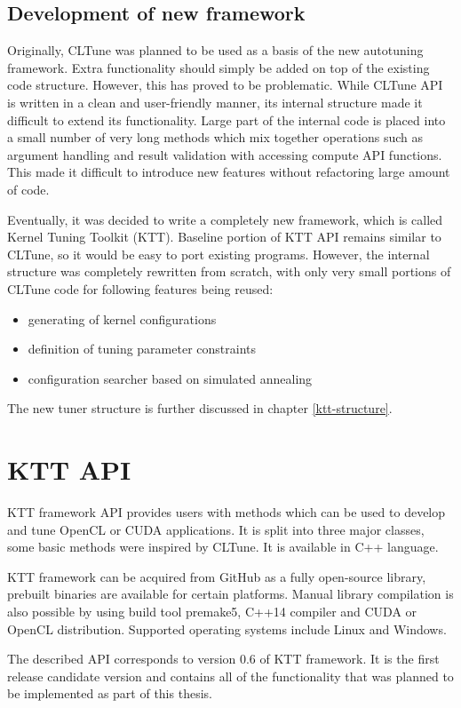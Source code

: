 \documentclass
[
    digital, %
    oneside, %
    table, %
    nolof, %
    nolot, %
    nocover %
]{fithesis3}
\begin{document}
\section{Development of new framework}
Originally, CLTune was planned to be used as a basis of the new autotuning framework. Extra functionality should simply be added on top of the
existing code structure. However, this has proved to be problematic. While CLTune API is written in a clean and user-friendly manner, its
internal structure made it difficult to extend its functionality. Large part of the internal code is placed into a small number of very long methods
which mix together operations such as argument handling and result validation with accessing compute API functions. This made it difficult to
introduce new features without refactoring large amount of code.

Eventually, it was decided to write a completely new framework, which is called Kernel Tuning Toolkit (KTT). Baseline portion of KTT API remains
similar to CLTune, so it would be easy to port existing programs. However, the internal structure was completely rewritten from scratch, with only
very small portions of CLTune code for following features being reused:
\begin{itemize}
    \item generating of kernel configurations
    \item definition of tuning parameter constraints
    \item configuration searcher based on simulated annealing
\end{itemize}
The new tuner structure is further discussed in chapter \ref{ktt-structure}.

\chapter{KTT API}
\label{ktt-api}
KTT framework API provides users with methods which can be used to develop and tune OpenCL or CUDA applications. It is split into three major
classes, some basic methods were inspired by CLTune. It is available in C++ language.

KTT framework can be acquired from GitHub as a fully open-source library, prebuilt binaries are available for certain platforms. Manual library
compilation is also possible by using build tool premake5, C++14 compiler and CUDA or OpenCL distribution. Supported operating systems include Linux
and Windows.

The described API corresponds to version 0.6 of KTT framework. It is the first release candidate version and contains all of the functionality that was
planned to be implemented as part of this thesis.
\end{document}

